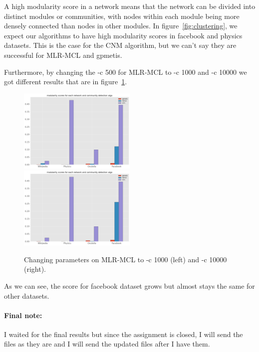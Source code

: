 \documentclass[letterpaper, 11pt]{article}
\newcommand{\1}{\mathds{1}}	%
\theoremstyle{definition}
\begin{document}
A high modularity score in a network means that the network can be divided into distinct modules or communities, with nodes within each module being more densely connected than nodes in other modules. In figure~\ref{fig:clustering}, we expect our algorithms to have high modularity scores in facebook and physics datasets. This is the case for the CNM algorithm, but we can't say they are successful for MLR-MCL and gpmetis.

Furthermore, by changing the -c 500 for MLR-MCL to -c 1000 and -c 10000 we got different results that are in figure~\ref{fig:c}.
\begin{figure}[h]
\includegraphics[width=0.5\textwidth]{output1000.png}
\includegraphics[width=0.5\textwidth]{output10000.png}
\captionsetup{justification=centering,margin=0.5cm}
\caption{Changing parameters on MLR-MCL to -c 1000 (left) and -c 10000 (right).}
\label{fig:c}
\end{figure}

As we can see, the score for facebook dataset grows but almost stays the same for other datasets.

\paragraph{Final note:}I waited for the final results but since the assignment is closed, I will send the files as they are and I will send the updated files after I have them.

\newpage


\end{document}
